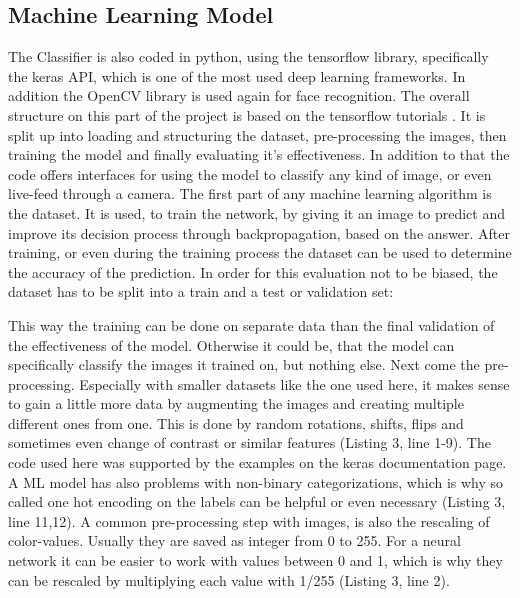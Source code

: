 \subsection{Machine Learning Model}

The Classifier is also coded in python, using the tensorflow library,
specifically the keras API, which is one of the most used deep learning
frameworks. In addition the OpenCV library is used again for face recognition. 
\newline
The overall structure on this part of the project is based on the tensorflow
tutorials \cite{tut}. It is split up into loading and structuring the dataset,
pre-processing the images, then training the model and finally evaluating it's
effectiveness. In addition to that the code offers interfaces for using the
model to classify any kind of image, or even live-feed through a camera.
\newline
The first part of any machine learning algorithm is the dataset. It is used,
to train the network, by giving it an image to predict and improve its decision 
process through backpropagation, based on the answer. After
training, or even during the training process the dataset can be used to
determine the accuracy of the prediction. In order for this evaluation not to be
biased, the dataset has to be split into a train and a test or validation set:

This way the training can be done on separate data than the final validation of
the effectiveness of the model. Otherwise it could be, that the model can
specifically classify the images it trained on, but nothing else.
\newline
Next come the pre-processing. Especially with smaller datasets like the one used
here, it makes sense to gain a little more data by augmenting the images and
creating multiple different ones from one. This is done by random rotations,
shifts, flips and sometimes even change of contrast or similar features (Listing
3, line 1-9). The code used here was supported by the examples on the keras
documentation page. %
\newline
A ML model has also problems with non-binary categorizations, which is why so
called one hot encoding on the labels can be helpful or even necessary (Listing
3, line 11,12). 
\newline
A common pre-processing step with images, is also the rescaling of color-values.
Usually they are saved as integer from 0 to 255. For a neural network it can be
easier to work with values between 0 and 1, which is why they can be rescaled by
multiplying each value with 1/255 (Listing 3, line 2).

